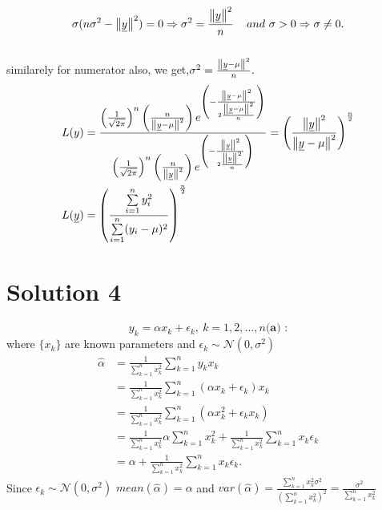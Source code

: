 \documentclass[a4paper,english,12pt]{article}
\begin{document}
$$\sigma(n\sigma^2 - \left\lVert\underline{y}\right\rVert^2)=0\Rightarrow \sigma^2 = \frac{\left\lVert\underline{y}\right\rVert^2}{n}\,\,\,\,\,\,\, and \,\, \sigma > 0 \Rightarrow \sigma \neq 0.$$\\
similarely for numerator also, we get,$\sigma^2=\frac{\left\lVert\underline{y}-\mu\right\rVert^2}{n}.$\\
\begin{align*}
L(y)&=\frac{\left(\frac{1}{\sqrt{2\pi}}\right)^n \left(\frac{n}{\left\lVert\underline{y}-\mu\right\rVert^2}\right)e^{\left(-\frac{ \left\lVert\underline{y}-\mu\right\rVert^2}{2 \frac{\left\lVert\underline{y}-\mu\right\rVert^2}{n}} \right)}}{\left(\frac{1}{\sqrt{2\pi}}\right)^n \left(\frac{n}{\left\lVert\underline{y}\right\rVert^2}\right)e^{\left(-\frac{ \left\lVert\underline{y}\right\rVert^2}{2 \frac{\left\lVert\underline{y}\right\rVert^2}{n}} \right)}}=\left(\frac{\left\lVert\underline{y}\right\rVert^2}{\left\lVert\underline{y}-\mu\right\rVert^2}\right)^{\frac{n}{2}}\\
L(\underline{y})&=\left(\frac{\sum \limits_{i=1}^n y_i^2}{\sum \limits_{i=1}^n (y_i - \mu)^2}\right)^{\frac{n}{2}}\\
\end{align*}

\section{Solution 4}
\begin{equation*}
y_k=\alpha x_k+\epsilon_k, \ k = 1,2,\dots,n
\textbf{(a) :}
\end{equation*}
where $\{x_k\}$ are known parameters and $\epsilon_k \sim \mathcal{N}(0,\sigma^2)$
\begin{align*}
\widehat{\alpha }&=\frac{1}{\sum\limits_{k=1}^{n}x_{k}^2}\sum\limits_{k=1}^{n}y_{k}x_{k}\\
  &=\frac{1}{\sum\limits_{k=1}^{n}x_{k}^2}\sum\limits_{k=1}^{n}(\alpha x_{k}+\epsilon_{k})x_{k}\\
  &=\frac{1}{\sum\limits_{k=1}^{n}x_{k}^2}\sum\limits_{k=1}^{n}(\alpha x_{k}^2+\epsilon_{k} x_{k})\\
  &=\frac{1}{\sum\limits_{k=1}^{n} x_{k}^2}\alpha\sum_{k=1}^nx_k^2+\frac{1}{\sum\limits_{k=1}^{n} x_{k}^2}\sum_{k=1}^n x_k\epsilon_k\\
  &=\alpha+\frac{1}{\sum\limits_{k=1}^{n} x_{k}^2}\sum_{k=1}^n x_k\epsilon_k.
\end{align*}
Since $\epsilon_k \sim \mathcal{N}(0,\sigma^2)$ $mean(\widehat{\alpha})=\alpha$ and $var(\widehat{\alpha})=\frac{\sum_{k=1}^nx_k^2\sigma^2}{\left(\sum_{k=1}^nx_k^2\right)^2}=\frac{\sigma^2}{\sum_{k=1}^nx_k^2}$
\end{document}
